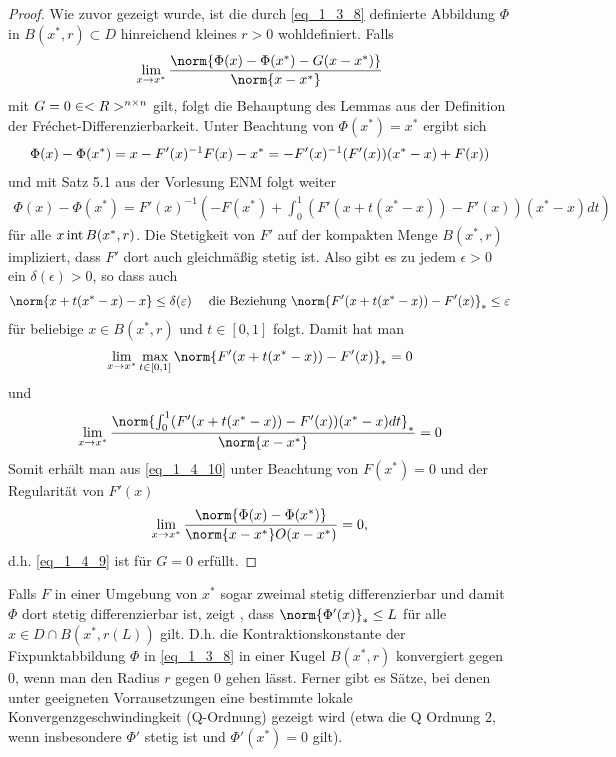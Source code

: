 \begin{proof}
	Wie zuvor gezeigt wurde, ist die durch \cref{eq_1_3_8} definierte Abbildung $\Phi$ in $B(x^{\ast},r)\subset D$ hinreichend kleines $r>0$ wohldefiniert. Falls
	\begin{align}
		\lim_{x\to x^{\ast}} \frac{\norm{\Phi(x) - \Phi(x^{\ast}) - G(x-x^{\ast})}}{\norm{x-x^{\ast}}} \label{eq_1_4_9}
	\end{align}
	mit $G = 0\in <R>^{n \times n}$ gilt, folgt die Behauptung des Lemmas aus der Definition der Fréchet-Differenzierbarkeit. Unter Beachtung von $\Phi(x^{\ast}) = x^{\ast}$ ergibt sich
	\begin{align}
	\Phi(x) - \Phi(x^{\ast}) = x - F'(x)^{-1}F(x) - x^{\ast} = -F'(x)^{-1}(F'(x))(x^{\ast}-x)+F(x))\notag
	\end{align}
	und mit Satz 5.1 aus der Vorlesung ENM folgt weiter
	\begin{align}
		\Phi(x) - \Phi(x^{\ast}) = F'(x)^{-1}\left( -F(x^{\ast}) + \int_{0}^{1} (F'(x+t(x^{\ast}-x)) - F'(x))(x^{\ast}-x)dt\right)\label{eq_1_4_10}
	\end{align}
	für alle $x \operatorname{int} B(x^{\ast},r)$. Die Stetigkeit von $F'$ auf der kompakten Menge $B(x^{\ast},r)$ impliziert, dass $F'$ dort auch gleichmäßig stetig ist. Also gibt es zu jedem $\epsilon > 0$ ein $\delta(\epsilon) > 0$, so dass auch
	\begin{align}
		\norm{x+t(x^{\ast}-x) - x}\le \delta(\epsilon) \quad \text{ die Beziehung } \norm{F'(x+t(x^{\ast}-x)) -F'(x)}_{\ast} \le \epsilon\notag
	\end{align}
	für beliebige $x \in B(x^{\ast},r)$ und $t \in [0,1]$ folgt. Damit hat man
	\begin{align}
		\lim_{x\to x^{\ast}}\max_{t\in[0,1]} \norm{F'(x+t(x^{\ast}-x)) -F'(x)}_{\ast} = 0 \notag
	\end{align}
	und
	\begin{align}
		\lim_{x\to x^{\ast}} \frac{\norm{\int_{0}^{1} (F'(x+t(x^{\ast} - x)) -F'(x))(x^{\ast}-x)dt}_{\ast}}{\norm{x-x^{\ast}}} = 0 \notag
	\end{align}
	Somit erhält man aus \cref{eq_1_4_10} unter Beachtung von $F(x^{\ast}) = 0$ und der Regularität von $F'(x)$
	\begin{align}
		\lim_{x\to x^{\ast}} \frac{\norm{\Phi(x) - \Phi(x^{\ast})}}{\norm{x-x^{\ast}}O(x-x^{\ast})} = 0,\notag
	\end{align} %
	d.h. \cref{eq_1_4_9} ist für $G=0$ erfüllt.
\end{proof}

\begin{remark}
	Falls $F$ in einer Umgebung von $x^{\ast}$ sogar zweimal stetig differenzierbar und damit $\Phi$ dort stetig differenzierbar ist, zeigt , dass $\norm{\Phi'(x)}_{\ast} \le L$ für alle $x \in D \cap B(x^{\ast},r(L))$ gilt. D.h. die Kontraktionskonstante der Fixpunktabbildung $\Phi$ in \cref{eq_1_3_8} in einer Kugel $B(x^{\ast},r)$ konvergiert gegen $0$, wenn man den Radius $r$ gegen $0$ gehen lässt. Ferner gibt es Sätze, bei denen unter geeigneten Vorrausetzungen eine bestimmte lokale Konvergenzgeschwindingkeit (Q-Ordnung) gezeigt wird (etwa die Q Ordnung $2$, wenn insbesondere $\Phi'$ stetig ist und $\Phi'(x^{\ast}) = 0$ gilt).
\end{remark}